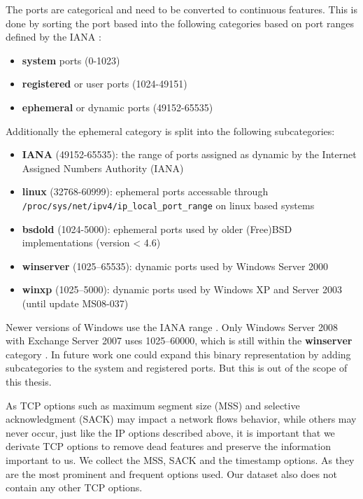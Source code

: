 \documentclass[
	ngerman,
	ruledheaders=section,%
	class=report,%
	thesis={type=bachelor},%
	accentcolor=9c,%
	custommargins=true,%
	marginpar=false,%
	parskip=half-,%
	fontsize=11pt,%
]{tudapub}
\begin{document}
The ports are categorical and need to be converted to continuous features.
This is done by sorting the port based into the following categories based on port ranges defined by the IANA \cite{ServiceNameTransport}:
\begin{itemize}
    \item \textbf{system} ports (0-1023)
    \item \textbf{registered} or user ports (1024-49151)
    \item \textbf{ephemeral} or dynamic ports (49152-65535)
\end{itemize}
Additionally the ephemeral category is split into the following subcategories:
\begin{itemize}
    \item \textbf{IANA} (49152-65535): the range of ports assigned as dynamic by the Internet Assigned Numbers Authority (IANA) \cite{ServiceNameTransport}
    \item \textbf{linux} (32768-60999): ephemeral ports accessable through \lstinline{/proc/sys/net/ipv4/ip_local_port_range} on linux based systems
    \item \textbf{bsdold} (1024-5000): ephemeral ports used by older (Free)BSD implementations (version < 4.6) \cite{EphemeralPortRange}
    \item \textbf{winserver} (1025–65535): dynamic ports used by Windows Server 2000 \cite{DefaultDynamicPort} \cite{WhenYouTry}
    \item \textbf{winxp} (1025–5000): dynamic ports used by Windows XP \cite{CableGuyDecember} and Server 2003 (until update MS08-037) \cite{YouExperienceIssues}
\end{itemize}
Newer versions of Windows use the IANA range \cite{DefaultDynamicPort}.
Only Windows Server 2008 with Exchange Server 2007 uses 1025–60000, which is still within the \textbf{winserver} category \cite{DefaultDynamicPort}.
In future work one could expand this binary representation by adding subcategories to the system and registered ports.
But this is out of the scope of this thesis.

As TCP options such as maximum segment size (MSS) and selective acknowledgment (SACK) may impact a network flows behavior,
while others may never occur, just like the IP options described above,
it is important that we derivate TCP options to remove dead features and preserve the information important to us.
We collect the MSS, SACK and the timestamp options.
As they are the most prominent and frequent options used.
Our dataset also does not contain any other TCP options.
\end{document}

